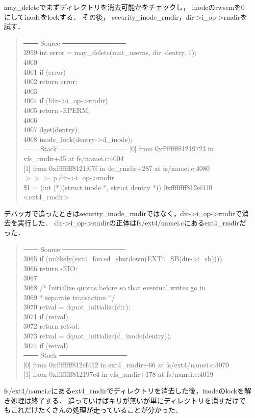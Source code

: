 may\_deleteでまずディレクトリを消去可能かをチェックし，
inodeのrwsemを0にしてinodeをlockする．
その後， security\_inode\_rmdir，dir->i\_op->rmdirを試す．
\begin{quote}
─── Source ─────────────
\\
 3999      int error = may\_delete(mnt\_userns, dir, dentry, 1); \\
 4000 \\
 4001      if (error) \\
 4002          return error; \\
 4003 \\
 4004      if (!dir->i\_op->rmdir) \\
 4005          return -EPERM; \\
 4006 \\
 4007      dget(dentry); \\
 4008      inode\_lock(dentry->d\_inode); \\
─── Stack ──────────────
{[0]} from 0xffffffff81219723 in vfs\_rmdir+35 at fs/namei.c:4004 \\
{[1]} from 0xffffffff8121f07f in do\_rmdir+287 at fs/namei.c:4080 \\
$>>>$ p dir->i\_op->rmdir \\
\$1 = (int (*)(struct inode *, struct dentry *)) 0xffffffff812ef410 <ext4\_rmdir>
\end{quote}
デバッガで追ったときはsecurity\_inode\_rmdirではなく，dir->i\_op->rmdirで消去を実行した．
dir->i\_op->rmdirの正体はfs/ext4/namei.cにあるext4\_rmdirだった．
\begin{quote}
─── Source ─────────────
\\
 3065      if (unlikely(ext4\_forced\_shutdown(EXT4\_SB(dir->i\_sb)))) \\
 3066          return -EIO; \\
 3067 \\
 3068      /* Initialize quotas before so that eventual writes go in \\
 3069       * separate transaction */ \\
 3070      retval = dquot\_initialize(dir); \\
 3071      if (retval) \\
 3072          return retval; \\
 3073      retval = dquot\_initialize(d\_inode(dentry)); \\
 3074      if (retval) \\
─── Stack ──────────────
\\
{[0]} from 0xffffffff812ef452 in ext4\_rmdir+66 at fs/ext4/namei.c:3070 \\
{[1]} from 0xffffffff812197e4 in vfs\_rmdir+178 at fs/namei.c:4019
\end{quote}

fs/ext4/namei.cにあるext4\_rmdirでディレクトリを消去した後，inodeのlockを解き処理は終了する．
追っていけばキリが無いが単にディレクトリを消すだけでもこれだけたくさんの処理が走っていることが分かった．

